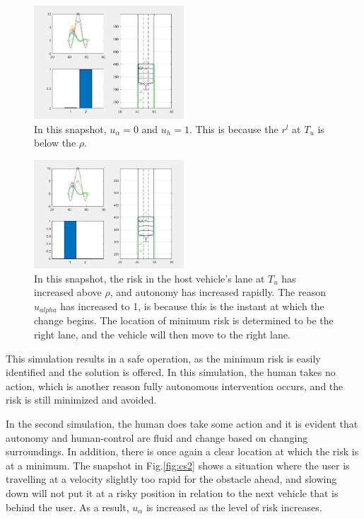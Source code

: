 \documentclass[conference]{IEEEtran}
\begin{document}
\begin{figure}[ht]
    \includegraphics[width=0.5\textwidth]{cs1.JPG}
    \caption{In this snapshot, $u_{\alpha} = 0$ and $u_{h} = 1$. This is because the $r^l$ at $T_u$ is below the $\rho$.}
    \label{fig:cs1}
\end{figure}

\begin{figure}[ht]
    \includegraphics[width=0.5\textwidth]{cs1b.JPG}
    \caption{In this snapshot, the risk in the host vehicle's lane at $T_u$ has increased above $\rho$, and autonomy has increased rapidly. The reason $u_{alpha}$ has increased to 1, is because this is the instant at which the change begins. The location of minimum risk is determined to be the right lane, and the vehicle will then move to the right lane.}
    \label{fig:cs1b}
\end{figure}

This simulation results in a safe operation, as the minimum risk is easily identified and the solution is offered. In this simulation, the human takes no action, which is another reason fully autonomous intervention occurs, and the risk is still minimized and avoided.


In the second simulation, the human does take some action and it is evident that autonomy and human-control are fluid and change based on changing surroundings. In addition, there is once again a clear location at which the risk is at a minimum. The snapshot in Fig.\ref{fig:cs2} shows a situation where the user is travelling at a velocity slightly too rapid for the obstacle ahead, and slowing down will not put it at a risky position in relation to the next vehicle that is behind the user. As a result, $u_{\alpha}$ is increased as the level of risk increases.
\end{document}

